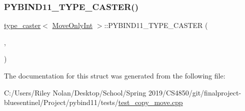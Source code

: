 \subsubsection{\texorpdfstring{PYBIND11\_TYPE\_CASTER()}{PYBIND11\_TYPE\_CASTER()}}
{\footnotesize\ttfamily \mbox{\hyperlink{classtype__caster}{type\+\_\+caster}}$<$ \mbox{\hyperlink{class_move_only_int}{Move\+Only\+Int}} $>$\+::P\+Y\+B\+I\+N\+D11\+\_\+\+T\+Y\+P\+E\+\_\+\+C\+A\+S\+T\+ER (\begin{DoxyParamCaption}\item[{\mbox{\hyperlink{class_move_only_int}{Move\+Only\+Int}}}]{,  }\item[{\mbox{\hyperlink{descr_8h_af114703e20c6527e87163eb2798f74b8}{\+\_\+}}(\char`\"{}Move\+Only\+Int\char`\"{})}]{ }\end{DoxyParamCaption})}



The documentation for this struct was generated from the following file\+:\begin{DoxyCompactItemize}
\item 
C\+:/\+Users/\+Riley Nolan/\+Desktop/\+School/\+Spring 2019/\+C\+S4850/git/finalproject-\/bluesentinel/\+Project/pybind11/tests/\mbox{\hyperlink{test__copy__move_8cpp}{test\+\_\+copy\+\_\+move.\+cpp}}\end{DoxyCompactItemize}
